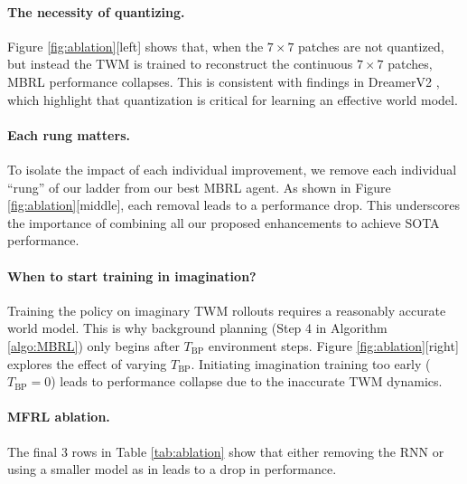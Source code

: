 \paragraph{The necessity of quantizing.}
Figure \ref{fig:ablation}[left] shows that, when the $7\times7$ patches are not quantized, but instead the TWM is trained to reconstruct the continuous $7\times7$ patches, MBRL performance collapses. This is consistent with findings in DreamerV2 \citep{hafner2021benchmarking}, which highlight that quantization is critical for learning an effective world model.


\paragraph{Each rung matters.} To isolate the impact of each individual improvement, we remove each individual ``rung'' of our ladder from our best MBRL agent. As shown in Figure \ref{fig:ablation}[middle], each removal leads to a performance drop. This underscores the importance of combining all our proposed enhancements to achieve SOTA performance. 


\paragraph{When to start training in imagination?} Training the policy on imaginary TWM rollouts requires a reasonably accurate world model. This is why background planning (Step 4 in Algorithm \ref{algo:MBRL})
only begins after $T_{\text{BP}}$ environment steps.
Figure \ref{fig:ablation}[right]
explores the effect of varying $T_{\text{BP}}$.
Initiating imagination training too early ($T_{\text{BP}}=0$) leads to performance collapse due to the inaccurate TWM dynamics.

\paragraph{MFRL ablation.} The final 3 rows in Table \ref{tab:ablation} show that either removing the RNN or using a smaller model as in \citet{moon2024discovering} leads to a drop in performance.


